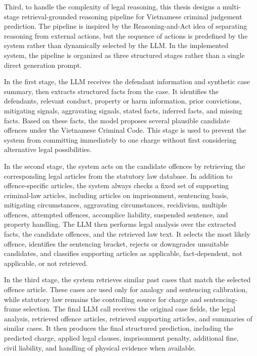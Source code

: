 \documentclass[../main.tex]{subfiles}
\begin{document}
Third, to handle the complexity of legal reasoning, this thesis designs a multi-stage retrieval-grounded reasoning pipeline for Vietnamese criminal judgement prediction. The pipeline is inspired by the Reasoning-and-Act idea of separating reasoning from external actions, but the sequence of actions is predefined by the system rather than dynamically selected by the LLM. In the implemented system, the pipeline is organized as three structured stages rather than a single direct generation prompt.

In the first stage, the LLM receives the defendant information and synthetic case summary, then extracts structured facts from the case. It identifies the defendants, relevant conduct, property or harm information, prior convictions, mitigating signals, aggravating signals, stated facts, inferred facts, and missing facts. Based on these facts, the model proposes several plausible candidate offences under the Vietnamese Criminal Code. This stage is used to prevent the system from committing immediately to one charge without first considering alternative legal possibilities.

In the second stage, the system acts on the candidate offences by retrieving the corresponding legal articles from the statutory law database. In addition to offence-specific articles, the system always checks a fixed set of supporting criminal-law articles, including articles on imprisonment, sentencing basis, mitigating circumstances, aggravating circumstances, recidivism, multiple offences, attempted offences, accomplice liability, suspended sentence, and property handling. The LLM then performs legal analysis over the extracted facts, the candidate offences, and the retrieved law text. It selects the most likely offence, identifies the sentencing bracket, rejects or downgrades unsuitable candidates, and classifies supporting articles as applicable, fact-dependent, not applicable, or not retrieved.

In the third stage, the system retrieves similar past cases that match the selected offence article. These cases are used only for analogy and sentencing calibration, while statutory law remains the controlling source for charge and sentencing-frame selection. The final LLM call receives the original case fields, the legal analysis, retrieved offence articles, retrieved supporting articles, and summaries of similar cases. It then produces the final structured prediction, including the predicted charge, applied legal clauses, imprisonment penalty, additional fine, civil liability, and handling of physical evidence when available.
\end{document}
